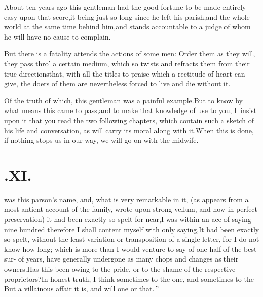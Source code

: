 \documentclass{article}
\begin{document}
About ten years ago this gentleman had the good fortune to be
made entirely easy upon that score,\tsk  it being just so long
since he left his parish,\tsk  and the whole world at the same
time behind him,\tsk  and stands accountable to a judge of whom he
will have no cause to complain.

But there is a fatality attends the actions of some men: Order
them as they will, they pass thro’ a certain medium, which so twists and refracts them from their true
directions\tsh  that, with all the titles to praise which a
rectitude of heart can give, the doers of them are nevertheless
forced to live and die without it.

Of the truth of which, this gentleman was a painful
example.\tsh  But to know by what means this came to
pass,\tsk  and to make that knowledge of use to you, I~insist upon
it that you read the two following chapters, which contain such a
sketch of his life and conversation, as will carry its moral along
with it.\tsk  When this is done, if nothing stops us in our way,
we will go on with the midwife.

\null
\section{.\enspace XI.}

 was this parson’s name, and, what is very remarkable in it, (as
appears from a most antient account of the family, wrote upon strong vellum, and
now in perfect preservation) it had been exactly so spelt for near,\tsk  I was
within an ace of saying nine hundred\break
{}
therefore I
shall content myself with only saying,\tsh  It had been exactly so spelt, without the
least variation or transposition of a single letter, for I do not know how long;
which is more than I would venture to say of one half of the best sur-\break 
{} of years, have generally undergone as many chops and
changes as their owners.\tsk  Has this been owing to the pride, or to the shame of
the respective proprietors?\tsk  In honest truth, I think sometimes to the one, and
sometimes to the  But a villainous affair
it is, and will one 
\lqq or that.\,” 
\end{document}
